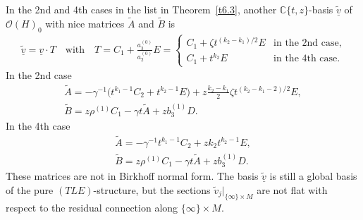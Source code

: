 \documentclass[10pt,a4paper]{amsart}
\numberwithin{equation}{section}
\numberwithin{figure}{section}
\newcommand{\C}{{\mathbb C}}
\newcommand{\OO}{{\mathcal O}}
\newcommand{\www}{\widetilde}
\newcommand{\uuuu}{\underline}
\begin{document}
\begin{Remark}\label{t6.6}
In the 2nd and 4th cases in the list in Theorem~\ref{t6.3},
another $\C\{t,z\}$-basis $\uuuu{\www v}$
of~$\OO(H)_0$ with nice matrices $\www A$ and $\www B$
is
\begin{gather*}%
\uuuu{\www v}=\uuuu{v}\cdot T\quad\text{with}\quad
T=C_1+\frac{a_3^{(0)}}{a_2^{(0)}}E
=\begin{cases}
C_1+\zeta t^{(k_2-k_1)/2}E & \text{in the 2nd case,}\\
C_1+t^{k_2}E & \text{in the 4th case.}
\end{cases}
\end{gather*}
In the 2nd case
\begin{gather*}%
\www A= -\gamma^{-1}\big(t^{k_1-1}C_2 + t^{k_2-1}E\big) + z\frac{k_2-k_1}{2}\zeta t^{(k_2-k_1-2)/2}E,
\\
\www B= z\rho^{(1)} C_1 -\gamma t\www A +
z b_3^{(1)} D.\nonumber
\end{gather*}
In the 4th case
\begin{gather*}%
\www A= -\gamma^{-1}t^{k_1-1}C_2 + zk_2t^{k_2-1}E,\\
\www B= z\rho^{(1)} C_1 -\gamma t\www A +z b_3^{(1)} D.\nonumber
\end{gather*}
These matrices are not in Birkhoff normal form.
The basis $\uuuu{\www v}$ is still a global basis
of the pure $(TLE)$-structure, but
the sections $\www v_j|_{\{\infty\}\times M}$ are not
flat with respect to the residual connection along
$\{\infty\}\times M$.
\end{Remark}
\end{document}
